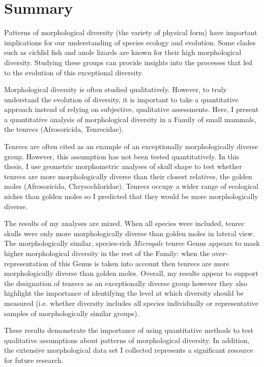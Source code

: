 \chapter*{Summary}

	Patterns of morphological diversity (the variety of physical form) have important implications for our understanding of species ecology and evolution. Some clades such as cichlid fish and anole lizards are known for their high morphological diversity. Studying these groups can provide insights into the processes that led to the evolution of this exceptional diversity. 

	Morphological diversity is often studied qualitatively. However, to truly understand the evolution of diversity, it is important to take a quantitative approach instead of relying on subjective, qualitative assessments. Here, I present a quantitative analysis of morphological diversity in a Family of small mammals, the tenrecs (Afrosoricida, Tenrecidae). 
	
	Tenrecs are often cited as an example of an exceptionally morphologically diverse group. However, this assumption has not been tested quantitatively. In this thesis, I use geometric morphometric analyses of skull shape to test whether tenrecs are more morphologically diverse than their closest relatives, the golden moles (Afrosoricida, Chrysochloridae). Tenrecs occupy a wider range of ecological niches than golden moles so I predicted that they would be more morphologically diverse. 
	
	The results of my analyses are mixed. When all species were included, tenrec skulls were only more morphologically diverse than golden moles in lateral view. The morphologically similar, species-rich \textit{Microgale} tenrec Genus appears to mask higher morphological diversity in the rest of the Family: when the over-representation of this Genus is taken into account then tenrecs are more morphologically diverse than golden moles.
	Overall, my results appear to support the designation of tenrecs as an exceptionally diverse group however they also highlight the importance of identifying the level at which diversity should be measured (i.e. whether diversity includes all species individually or representative samples of morphologically similar groups).
	
	These results demonstrate the importance of using quantitative methods to test qualitative assumptions about patterns of morphological diversity. In addition, the extensive morphological data set I collected represents a significant resource for future research.
	
